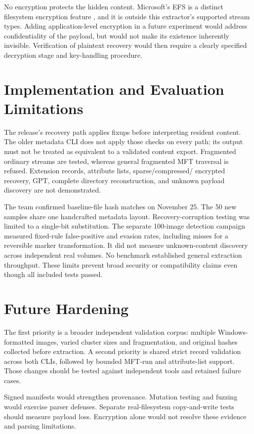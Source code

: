 No encryption protects the hidden content. Microsoft's EFS is a distinct
filesystem encryption feature \cite{efs}, and it is outside this extractor's
supported stream types. Adding application-level encryption in a future
experiment would address confidentiality of the payload, but would not make
its existence inherently invisible. Verification of plaintext recovery would
then require a clearly specified decryption stage and key-handling procedure.

\section{Implementation and Evaluation Limitations}
The release's recovery path applies fixups before interpreting resident
content. The older metadata CLI does not apply those checks on every path;
its output must not be treated as equivalent to a validated content export.
Fragmented ordinary streams are tested, whereas general fragmented MFT
traversal is refused. Extension records, attribute lists, sparse/compressed/
encrypted recovery, GPT, complete directory reconstruction, and unknown
payload discovery are not demonstrated.

The team confirmed baseline-file hash matches on November 25.
The 50 new samples share one handcrafted metadata layout.
Recovery-corruption testing was limited to a single-bit substitution.
The separate 100-image detection campaign measured fixed-rule false-positive
and evasion rates, including misses for a reversible marker transformation.
It did not measure unknown-content discovery across independent real volumes.
No benchmark established general extraction throughput. These limits prevent
broad security or compatibility claims even though all included tests passed.

\section{Future Hardening}
The first priority is a broader independent validation corpus: multiple
Windows-formatted images, varied cluster sizes and fragmentation, and
original hashes collected before extraction. A second priority is shared
strict record validation across both CLIs, followed by bounded MFT-run and
attribute-list support. Those changes should be tested against independent
tools and retained failure cases.

Signed manifests would strengthen provenance. Mutation testing and fuzzing
would exercise parser defenses. Separate real-filesystem copy-and-write
tests should measure payload loss. Encryption alone would not resolve these
evidence and parsing limitations.
